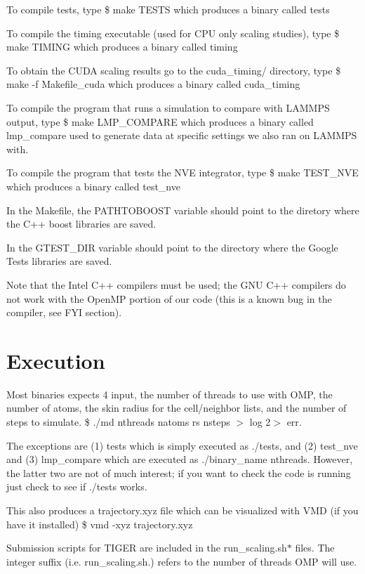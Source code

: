 To compile tests, type \$ make T\-E\-S\-T\-S which produces a binary called tests

To compile the timing executable (used for C\-P\-U only scaling studies), type \$ make T\-I\-M\-I\-N\-G which produces a binary called timing

To obtain the C\-U\-D\-A scaling results go to the cuda\-\_\-timing/ directory, type \$ make -\/f Makefile\-\_\-cuda which produces a binary called cuda\-\_\-timing

To compile the program that runs a simulation to compare with L\-A\-M\-M\-P\-S output, type \$ make L\-M\-P\-\_\-\-C\-O\-M\-P\-A\-R\-E which produces a binary called lmp\-\_\-compare used to generate data at specific settings we also ran on L\-A\-M\-M\-P\-S with.

To compile the program that tests the N\-V\-E integrator, type \$ make T\-E\-S\-T\-\_\-\-N\-V\-E which produces a binary called test\-\_\-nve

In the Makefile, the P\-A\-T\-H\-T\-O\-B\-O\-O\-S\-T variable should point to the diretory where the C++ boost libraries are saved.

In the G\-T\-E\-S\-T\-\_\-\-D\-I\-R variable should point to the directory where the Google Tests libraries are saved.

Note that the Intel C++ compilers must be used; the G\-N\-U C++ compilers do not work with the Open\-M\-P portion of our code (this is a known bug in the compiler, see F\-Y\-I section).

\section*{Execution}

Most binaries expects 4 input, the number of threads to use with O\-M\-P, the number of atoms, the skin radius for the cell/neighbor lists, and the number of steps to simulate. \$ ./md nthreads natoms rs nsteps $>$ log 2$>$ err.

The exceptions are (1) tests which is simply executed as ./tests, and (2) test\-\_\-nve and (3) lmp\-\_\-compare which are executed as ./binary\-\_\-name nthreads. However, the latter two are not of much interest; if you want to check the code is running just check to see if ./tests works.

This also produces a trajectory.\-xyz file which can be visualized with V\-M\-D (if you have it installed) \$ vmd -\/xyz trajectory.\-xyz

Submission scripts for T\-I\-G\-E\-R are included in the run\-\_\-scaling.\-sh$\ast$ files. The integer suffix (i.\-e. run\-\_\-scaling.\-sh.) refers to the number of threads O\-M\-P will use.

